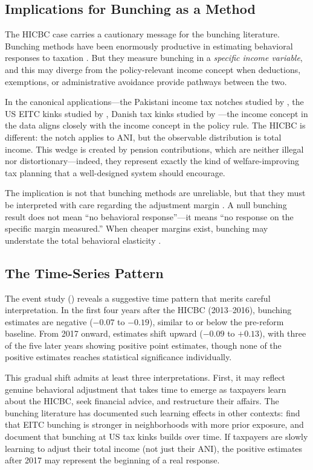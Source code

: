 \documentclass[12pt]{article}
\begin{document}
\subsection{Implications for Bunching as a Method}

The HICBC case carries a cautionary message for the bunching literature. Bunching methods have been enormously productive in estimating behavioral responses to taxation \citep{kleven2016}. But they measure bunching in a \emph{specific income variable}, and this may diverge from the policy-relevant income concept when deductions, exemptions, or administrative avoidance provide pathways between the two.

In the canonical applications---the Pakistani income tax notches studied by \citet{kleven2013}, the US EITC kinks studied by \citet{saez2010}, Danish tax kinks studied by \citet{chetty2011}---the income concept in the data aligns closely with the income concept in the policy rule. The HICBC is different: the notch applies to ANI, but the observable distribution is total income. This wedge is created by pension contributions, which are neither illegal nor distortionary---indeed, they represent exactly the kind of welfare-improving tax planning that a well-designed system should encourage.

The implication is not that bunching methods are unreliable, but that they must be interpreted with care regarding the adjustment margin \citep{chetty2012pp}. A null bunching result does not mean ``no behavioral response''---it means ``no response on the specific margin measured.'' When cheaper margins exist, bunching may understate the total behavioral elasticity \citep{saezslerodrz2012}.

\subsection{The Time-Series Pattern}

The event study () reveals a suggestive time pattern that merits careful interpretation. In the first four years after the HICBC (2013--2016), bunching estimates are negative ($-0.07$ to $-0.19$), similar to or below the pre-reform baseline. From 2017 onward, estimates shift upward ($-0.09$ to $+0.13$), with three of the five later years showing positive point estimates, though none of the positive estimates reaches statistical significance individually.

This gradual shift admits at least three interpretations. First, it may reflect genuine behavioral adjustment that takes time to emerge as taxpayers learn about the HICBC, seek financial advice, and restructure their affairs. The bunching literature has documented such learning effects in other contexts: \citet{chetty2013} find that EITC bunching is stronger in neighborhoods with more prior exposure, and \citet{mortenson2016} document that bunching at US tax kinks builds over time. If taxpayers are slowly learning to adjust their total income (not just their ANI), the positive estimates after 2017 may represent the beginning of a real response.
\end{document}
